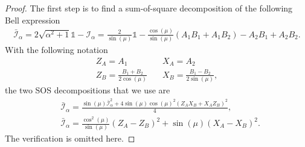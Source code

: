 \documentclass[11pt,letterpaper]{article}
\newcommand{\1}{\mathbb{1}}
\newcommand{\I}{\mathcal{I}}
\theoremstyle{definition}
\begin{document}
\begin{proof}
The first step is to find a sum-of-square decomposition of 
the following Bell expression
\begin{align}
	\bar{\I}_\alpha = 2\sqrt{\alpha^2+1} \1 - \I_\alpha
	= \frac{2}{\sin(\mu)} \1 - \frac{\cos(\mu)}{\sin(\mu)}(A_1B_1+A_1B_2) -  A_2B_1 + A_2B_2.
\end{align} 
With the following notation
\begin{align*}
	Z_A = A_1 &\quad X_A = A_2\\
	Z_B = \frac{B_1+B_2}{2\cos(\mu)} &\quad X_B = \frac{B_1-B_2}{2\sin(\mu)},
\end{align*}
the two SOS decompositions that we use are
\begin{align}
	\label{eq:sos1}&\bar{\I}_\alpha = \frac{\sin(\mu)\bar{\I}_\alpha^2 + 4\sin(\mu)\cos(\mu)^2(Z_AX_B+X_AZ_B)^2}{4},\\
	\label{eq:sos2}&\bar{\I}_\alpha = \frac{\cos^2(\mu)}{\sin(\mu)}(Z_A-Z_B)^2 + \sin(\mu) (X_A-X_B)^2.
\end{align}
The verification is omitted here.


\end{proof}
\end{document}
